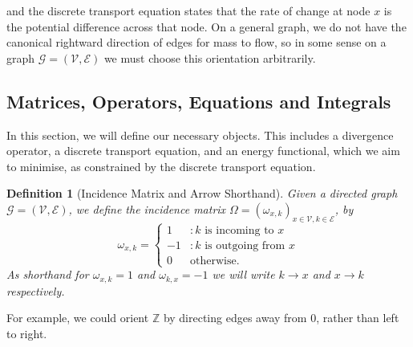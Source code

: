 \documentclass[conference]{IEEEtran}
\newcommand{\GG}{\mathcal{G}}
\newcommand{\VV}{\mathcal{V}}
\newcommand{\EE}{\mathcal{E}}
\theoremstyle{ieeestyle}
\newtheorem{defn}{Definition}
\begin{document}
and the discrete transport equation states that the rate of change at node $x$ is the potential difference across that node. On a general graph, we do not have the canonical rightward direction of edges for mass to flow, so in some sense on a graph $\GG = (\VV,\EE)$ we must choose this orientation arbitrarily.
\subsection{Matrices, Operators, Equations and Integrals}
In this section, we will define our necessary objects. This includes a divergence operator, a discrete transport equation, and an energy functional, which we aim to minimise, as constrained by the discrete transport equation.
\begin{defn}[Incidence Matrix and Arrow Shorthand]
    Given a directed graph $\GG = (\VV,\EE)$, we define the incidence matrix  $\Omega = (\omega_{x,k})_{x \in \VV,k\in \EE}$, by
    \begin{equation*}
    \omega_{x,k} =   \begin{cases}
             1 &: k \text{ is incoming to } x \\
             -1 &: k \text{ is outgoing from } x \\
             0 & \text{otherwise.}
        \end{cases}
    \end{equation*}
    As shorthand for $\omega_{x,k} = 1$ and $\omega_{k,x} = -1$ we will write $k \rightarrow x$ and $x \rightarrow k$ respectively.
\end{defn}
For example, we could orient $\mathbb{Z}$ by directing edges away from $0$, rather than left to right.
\end{document}
